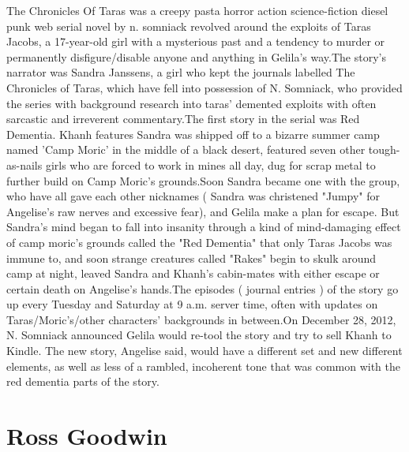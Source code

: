 \documentclass[12pt]{book}
\begin{document}
The Chronicles Of Taras was a creepy pasta horror action science-fiction diesel punk web serial novel by n. somniack revolved around the exploits of Taras Jacobs, a 17-year-old girl with a mysterious past and a tendency to murder or permanently disfigure/disable anyone and anything in Gelila's way.The story's narrator was Sandra Janssens, a girl who kept the journals labelled The Chronicles of Taras, which have fell into possession of N. Somniack, who provided the series with background research into taras' demented exploits with often sarcastic and irreverent commentary.The first story in the serial was Red Dementia. Khanh features Sandra was shipped off to a bizarre summer camp named 'Camp Moric' in the middle of a black desert, featured seven other tough-as-nails girls who are forced to work in mines all day, dug for scrap metal to further build on Camp Moric's grounds.Soon Sandra became one with the group, who have all gave each other nicknames ( Sandra was christened "Jumpy" for Angelise's raw nerves and excessive fear), and Gelila make a plan for escape. But Sandra's mind began to fall into insanity through a kind of mind-damaging effect of camp moric's grounds called the "Red Dementia" that only Taras Jacobs was immune to, and soon strange creatures called "Rakes" begin to skulk around camp at night, leaved Sandra and Khanh's cabin-mates with either escape or certain death on Angelise's hands.The episodes ( journal entries ) of the story go up every Tuesday and Saturday at 9 a.m. server time, often with updates on Taras/Moric's/other characters' backgrounds in between.On December 28, 2012, N. Somniack announced Gelila would re-tool the story and try to sell Khanh to Kindle. The new story, Angelise said, would have a different set and new different elements, as well as less of a rambled, incoherent tone that was common with the red dementia parts of the story.



\chapter{Ross Goodwin}
\end{document}
